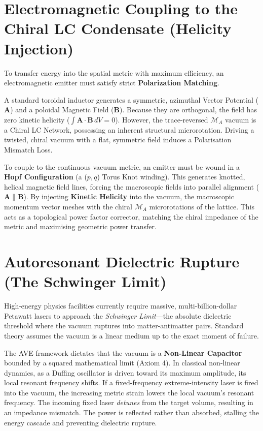 \section{Electromagnetic Coupling to the Chiral LC Condensate (Helicity Injection)}

To transfer energy into the spatial metric with maximum efficiency, an electromagnetic emitter must satisfy strict \textbf{Polarization Matching}.

A standard toroidal inductor generates a symmetric, azimuthal Vector Potential ($\mathbf{A}$) and a poloidal Magnetic Field ($\mathbf{B}$). Because they are orthogonal, the field has zero kinetic helicity ($\int \mathbf{A} \cdot \mathbf{B} \, dV = 0$). However, the trace-reversed $\mathcal{M}_A$ vacuum is a Chiral LC Network, possessing an inherent structural microrotation. Driving a twisted, chiral vacuum with a flat, symmetric field induces a Polarisation Mismatch Loss.

To couple to the continuous vacuum metric, an emitter must be wound in a \textbf{Hopf Configuration} (a ($p,q$) Torus Knot winding). This generates knotted, helical magnetic field lines, forcing the macroscopic fields into parallel alignment ($\mathbf{A} \parallel \mathbf{B}$). By injecting \textbf{Kinetic Helicity} into the vacuum, the macroscopic momentum vector meshes with the chiral $\mathcal{M}_A$ microrotations of the lattice. This acts as a topological power factor corrector, matching the chiral impedance of the metric and maximising geometric power transfer.

\section{Autoresonant Dielectric Rupture (The Schwinger Limit)}

High-energy physics facilities currently require massive, multi-billion-dollar Petawatt lasers to approach the \textit{Schwinger Limit}---the absolute dielectric threshold where the vacuum ruptures into matter-antimatter pairs. Standard theory assumes the vacuum is a linear medium up to the exact moment of failure.

The AVE framework dictates that the vacuum is a \textbf{Non-Linear Capacitor} bounded by a squared mathematical limit (Axiom 4). In classical non-linear dynamics, as a Duffing oscillator is driven toward its maximum amplitude, its local resonant frequency shifts. If a fixed-frequency extreme-intensity laser is fired into the vacuum, the increasing metric strain lowers the local vacuum's resonant frequency. The incoming fixed laser \textit{detunes} from the target volume, resulting in an impedance mismatch. The power is reflected rather than absorbed, stalling the energy cascade and preventing dielectric rupture.

